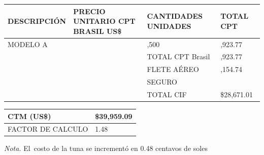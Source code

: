 \documentclass[
  stu,
  floatsintext,
  longtable,
  a4paper,
  nolmodern,
  notxfonts,
  notimes,
  12pt,
  colorlinks=true,linkcolor=blue,citecolor=blue,urlcolor=blue]{apa7}
\newcounter{none} %
\begin{document}
\begin{table}

{\caption{{Valor de Exportación CIF - Costo de la Tuna en el Puerto de
Sao Paulo}{\label{tbl-valor-cif-sao-paulo}}}}

{\def\LTcaptype{none} %
\begin{longtable}[]{@{}
  >{\raggedright\arraybackslash}p{}
  >{\raggedleft\arraybackslash}p{}
  >{\raggedleft\arraybackslash}p{}
  >{\raggedleft\arraybackslash}p{}@{}}
\toprule\noalign{}
\begin{minipage}[b]{\linewidth}\raggedright
DESCRIPCIÓN
\end{minipage} & \begin{minipage}[b]{\linewidth}\raggedleft
PRECIO UNITARIO CPT BRASIL US\$
\end{minipage} & \begin{minipage}[b]{\linewidth}\raggedleft
CANTIDADES UNIDADES
\end{minipage} & \begin{minipage}[b]{\linewidth}\raggedleft
TOTAL CPT
\end{minipage} \\
\midrule\noalign{}
\endhead
\bottomrule\noalign{}
\endlastfoot
MODELO A & 17.94917867 & 1,500 & 26,923.77 \\
& & TOTAL CPT Brasil & 26,923.77 \\
& & FLETE AÉREO & 1,154.74 \\
& & SEGURO & 592.5 \\
& & TOTAL CIF & \$28,671.01 \\
\end{longtable}
}

\end{table}

\begin{table}

{\caption{{Costos de Importación en
Brasil}{\label{tbl-costos-importacion-brasil}}}}

{\def\LTcaptype{none} %
\begin{longtable}[]{@{}ll@{}}
\toprule\noalign{}
CTM (US\$) & \$39,959.09 \\
\midrule\noalign{}
\endhead
\bottomrule\noalign{}
\endlastfoot
FACTOR DE CALCULO & 1.48 \\
\end{longtable}
}

\noindent \emph{Nota.} El~costo de la tuna se incrementó en 0.48
centavos de soles

\end{table}
\end{document}
